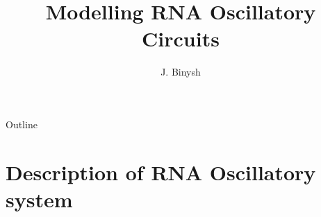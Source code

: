 \documentclass{beamer}
\title %
{Modelling RNA Oscillatory Circuits}
\subtitle
{}
\author %
{J. Binysh\inst{1}}
\institute[University of Warwick] %
{
  \inst{1}%
 	Centre for Complexity Science\\
  University of Warwick
 }
\begin{document}
\begin{frame}
  \titlepage
\end{frame}

\begin{frame}{Outline}
  \tableofcontents
\end{frame}





\section{Description of RNA Oscillatory system}
\end{document}
